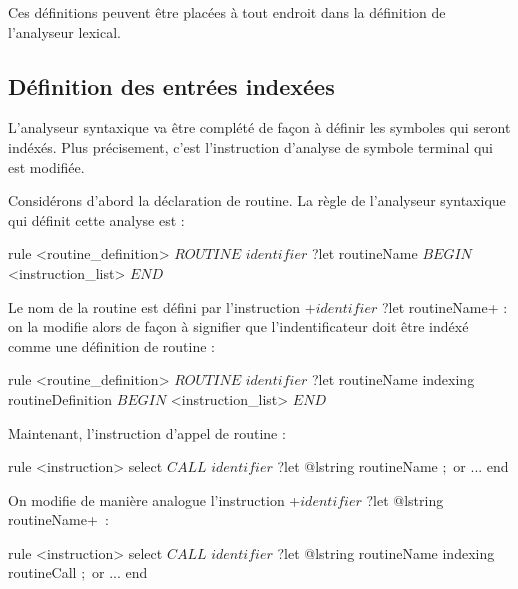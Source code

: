 \begin{galgas}
lexique logo_lexique indexing in "INDEXING" {
  ...
indexing routineDefinition : "Routine Definition"
  ...
indexing routineCall : "Routine call"
  ...
\end{galgas}


Ces définitions peuvent être placées à tout endroit dans la définition de l'analyseur lexical.








\subsection{Définition des entrées indexées}

L'analyseur syntaxique va être complété de façon à définir les symboles qui seront indéxés. Plus précisement, c'est l'instruction d'analyse de symbole terminal qui est modifiée.

Considérons d'abord la déclaration de routine. La règle de l'analyseur syntaxique qui définit cette analyse est :

\begin{galgas}
rule <routine_definition> {
  $ROUTINE$
  $identifier$ ?let routineName
  $BEGIN$
  <instruction_list>
  $END$
}
\end{galgas}

Le nom de la routine est défini par l'instruction \ggs+$identifier$ ?let routineName+ : on la modifie alors de façon à signifier que l'indentificateur doit être indéxé comme une définition de routine :

\begin{galgas}
rule <routine_definition> {
  $ROUTINE$
  $identifier$ ?let routineName indexing routineDefinition
  $BEGIN$
  <instruction_list>
  $END$
}
\end{galgas}

Maintenant, l'instruction d'appel de routine :

\begin{galgas}
rule <instruction> {
  select
    $CALL$
    $identifier$ ?let @lstring routineName
    $;$
  or
    ...
  end
}
\end{galgas}

On modifie de manière analogue l'instruction \ggs+$identifier$ ?let @lstring routineName+~:

\begin{galgas}
rule <instruction> {
  select
    $CALL$
    $identifier$ ?let @lstring routineName indexing routineCall
    $;$
  or
    ...
  end
}
\end{galgas}



